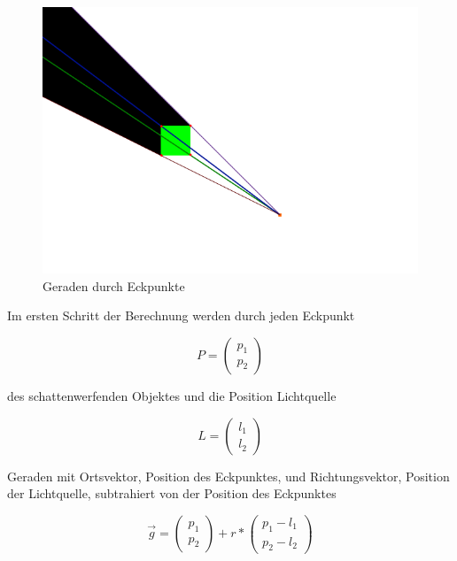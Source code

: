 \begin{figure}[t]
	\centering
	\includegraphics[width=\columnwidth]{images/durchfuehrung_1.png}
	\caption{Geraden durch Eckpunkte}
	\label{fig:durch2}
\end{figure}

Im ersten Schritt der Berechnung werden durch jeden Eckpunkt

\begin{equation}
	P = \left(\begin{array}{c} p_1 \\ p_2 \end{array}\right)
\end{equation}

des schattenwerfenden Objektes und die Position Lichtquelle

\begin{equation}
	L = \left(\begin{array}{c} l_1 \\ l_2 \end{array}\right)
\end{equation}

Geraden mit Ortsvektor, Position des Eckpunktes, und Richtungsvektor, Position der Lichtquelle,
subtrahiert von der Position des Eckpunktes

\begin{equation}
	\vec{g} = \left(\begin{array}{c} p_1 \\ p_2 \end{array}\right) + r * \left(\begin{array}{c} p_1 - l_1 \\ p_2 - l_2 \end{array}\right)
\end{equation}

